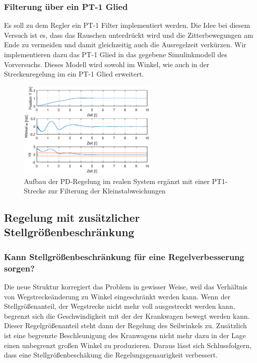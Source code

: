 \documentclass[10pt]{scrartcl}
\begin{document}
\subsubsection{Filterung über ein PT-1 Glied}
Es soll zu dem Regler ein PT-1 Filter implementiert werden. Die Idee bei diesem Versuch ist es, dass das Rauschen unterdrückt wird und die Zitterbewegungen am Ende zu vermeiden und damit gleichzeitig auch die Ausregelzeit verkürzen. Wir implementieren dazu das PT-1 Glied in das gegebene Simulinkmodell des Vorversuchs. Dieses Modell wird sowohl im Winkel, wie auch in der Streckenregelung im ein PT-1 Glied erweitert.

\begin{figure}[H]
	\centering
	\includegraphics[width=0.6\textwidth]{Figure45b1}
	\caption{Aufbau der PD-Regelung im realen System ergänzt mit einer PT1-Strecke zur Filterung der Kleinstabweichungen}
	\label{img:grafik-dummy}
\end{figure}

\subsection{Regelung mit zusätzlicher Stellgrößenbeschränkung}
\subsubsection{Kann Stellgrößenbeschränkung für eine Regelverbesserung sorgen?}
Die neue Struktur korregiert das Problem in gewisser Weise, weil das Verhältnis von Wegstreckeänderung zu Winkel eingeschränkt werden kann. Wenn der Stellgrößenanteil, der Wegstrecke nicht mehr voll ausgestreckt werden kann, begrenzt sich die Geschwindigkeit mit der der Krankwagen bewegt werden kann. Dieser Regelgrößenanteil steht dann der Regelung des Seilwinkels zu. Zusätzlich ist eine begrenzte Beschleunigung des Kranwagens nicht mehr dazu in der Lage einen unbegrenzt großen Winkel zu produzieren. Daraus lässt sich Schlussfolgern, dass eine Stellgrößenbeschäkung die Regelungsgenaurigkeit verbessert.
\end{document}
